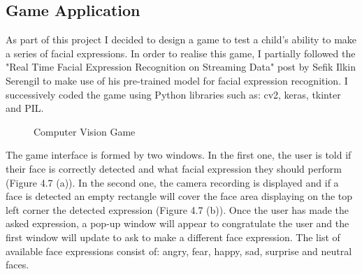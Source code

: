 \subsection{Game Application}
As part of this project I decided to design a game to test a child's ability to make a series of facial expressions. In order to realise this game, I partially followed the "Real Time Facial Expression Recognition on Streaming Data" post by Sefik Ilkin Serengil \cite{visiongame} to make use of his pre-trained model for facial expression recognition. I successively coded the game using Python libraries such as: cv2, keras, tkinter and PIL.

\begin{figure}[ht!]%
    \centering
    \qquad
    \caption{Computer Vision Game}%
    \label{fig:example2}%
\end{figure}

The game interface is formed by two windows. In the first one, the user is told if their face is correctly detected and what facial expression they should perform (Figure 4.7 (a)). In the second one, the camera recording is displayed and if a face is detected an empty rectangle will cover the face area displaying on the top left corner the detected expression (Figure 4.7 (b)). Once the user has made the asked expression, a pop-up window will appear to congratulate the user and the first window will update to ask to make a different face expression. The list of available face expressions consist of: angry, fear, happy, sad, surprise and neutral faces.
